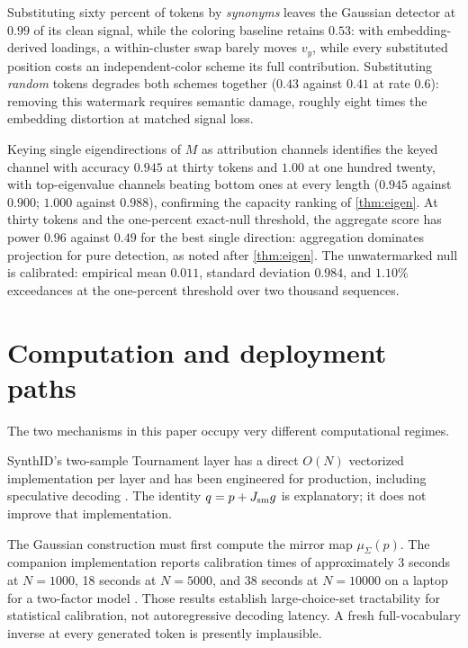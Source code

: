 \documentclass[11pt]{article}
\theoremstyle{definition}
\theoremstyle{remark}
\begin{document}
Substituting sixty percent of tokens by \emph{synonyms} leaves the
Gaussian detector at $0.99$ of its clean signal, while the coloring
baseline retains $0.53$: with embedding-derived loadings, a
within-cluster swap barely moves $v_y$, while every substituted
position costs an independent-color scheme its full contribution.
Substituting \emph{random} tokens degrades both schemes together
($0.43$ against $0.41$ at rate $0.6$): removing this watermark requires
semantic damage, roughly eight times the embedding distortion at
matched signal loss.

Keying single eigendirections of $M$ as attribution channels
identifies the keyed channel with accuracy $0.945$ at thirty tokens
and $1.00$ at one hundred twenty, with top-eigenvalue channels beating
bottom ones at every length ($0.945$ against $0.900$; $1.000$ against
$0.988$), confirming the capacity ranking of \cref{thm:eigen}. At
thirty tokens and the one-percent exact-null threshold, the aggregate
score has power $0.96$ against $0.49$ for the best single direction:
aggregation dominates projection for pure detection, as noted after
\cref{thm:eigen}. The unwatermarked null is calibrated: empirical mean
$0.011$, standard deviation $0.984$, and $1.10\%$ exceedances at the
one-percent threshold over two thousand sequences.

\section{Computation and deployment paths}
\label{sec:computation}

The two mechanisms in this paper occupy very different computational regimes.

SynthID's two-sample Tournament layer has a direct $O(N)$ vectorized implementation per layer and has been engineered for production, including speculative decoding \citep{dathathri2024synthid}. The identity $q=p+J_{\rm sm}g$ is explanatory; it does not improve that implementation.

The Gaussian construction must first compute the mirror map $\mu_\Sigma(p)$. The companion implementation reports calibration times of approximately 3 seconds at $N=1000$, 18 seconds at $N=5000$, and 38 seconds at $N=10000$ on a laptop for a two-factor model \citep{cotton2026calibration}. Those results establish large-choice-set tractability for statistical calibration, not autoregressive decoding latency. A fresh full-vocabulary inverse at every generated token is presently implausible.
\end{document}
